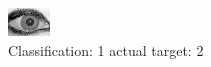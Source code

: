 \begin{figure}[h!]
\begin{center}
\includegraphics[width=0.60\columnwidth]{figures/ID2025_class_1_target_2.png}
\end{center}
\caption{ Classification: 1 actual target: 2}
\label{fig:ID2025_class_1_target_2}
\end{figure}
